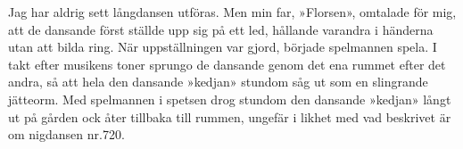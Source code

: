 \vspace*{7cm}
\begin{adjustwidth*}{29mm}{29mm}
Jag har aldrig sett långdansen utföras. Men min far, »Florsen», omtalade
för mig, att de dansande först ställde upp sig på ett led, hållande
varandra i händerna utan att bilda ring. \textemdash{} När uppställningen
var gjord, började spelmannen spela. I takt efter musikens toner sprungo
de dansande genom det ena rummet efter det andra, så att hela den
dansande »kedjan» stundom såg ut som en slingrande jätteorm. Med spelmannen
i spetsen drog stundom den dansande »kedjan» långt ut på gården ock
åter tillbaka till rummen, ungefär i likhet med vad beskrivet är om
nigdansen nr.\@ 720. %
\end{adjustwidth*}
